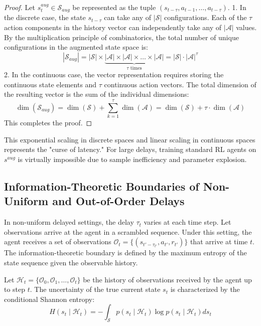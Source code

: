 \documentclass[manuscript, screen, review]{jair}
\begin{document}
\begin{proof}
Let $s^{aug}_t \in \mathcal{S}_{aug}$ be represented as the tuple $\left( s_{t - \tau}, a_{t - 1}, \dots, a_{t - \tau} \right)$. 
1. In the discrete case, the state $s_{t-\tau}$ can take any of $|\mathcal{S}|$ configurations. Each of the $\tau$ action components in the history vector can independently take any of $|\mathcal{A}|$ values. By the multiplication principle of combinatorics, the total number of unique configurations in the augmented state space is:
\begin{equation*}
    |\mathcal{S}_{aug}| = |\mathcal{S}| \times \underbrace{|\mathcal{A}| \times |\mathcal{A}| \times \dots \times |\mathcal{A}|}_{\tau \text{ times}} = |\mathcal{S}| \cdot |\mathcal{A}|^{\tau}
\end{equation*}
2. In the continuous case, the vector representation requires storing the continuous state elements and $\tau$ continuous action vectors. The total dimension of the resulting vector is the sum of the individual dimensions:
\begin{equation*}
    \dim(\mathcal{S}_{aug}) = \dim(\mathcal{S}) + \sum_{k=1}^{\tau} \dim(\mathcal{A}) = \dim(\mathcal{S}) + \tau \cdot \dim(\mathcal{A})
\end{equation*}
This completes the proof.
\end{proof}

This exponential scaling in discrete spaces and linear scaling in continuous spaces represents the "curse of latency." For large delays, training standard RL agents on $s^{aug}$ is virtually impossible due to sample inefficiency and parameter explosion.

\subsection{Information-Theoretic Boundaries of Non-Uniform and Out-of-Order Delays}
In non-uniform delayed settings, the delay $\tau_t$ varies at each time step. Let observations arrive at the agent in a scrambled sequence. Under this setting, the agent receives a set of observations $\mathcal{O}_t = \{ (s_{t' - \tau_{t'}}, a_{t'}, r_{t'}) \}$ that arrive at time $t$. The information-theoretic boundary is defined by the maximum entropy of the state sequence given the observable history.

\begin{definition}
Let $\mathcal{H}_t = \{ \mathcal{O}_0, \mathcal{O}_1, \dots, \mathcal{O}_t \}$ be the history of observations received by the agent up to step $t$. The uncertainty of the true current state $s_t$ is characterized by the conditional Shannon entropy:
\begin{equation}
    H(s_t \mid \mathcal{H}_t) = - \int_{\mathcal{S}} p(s_t \mid \mathcal{H}_t) \log p(s_t \mid \mathcal{H}_t) ds_t
\end{equation}
\end{definition}
\end{document}
